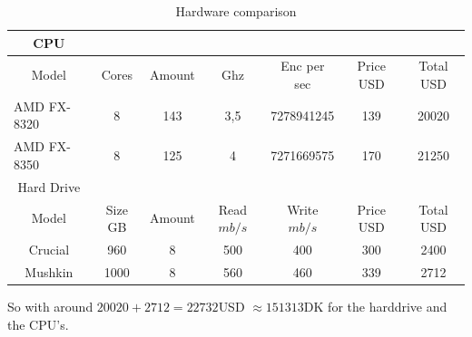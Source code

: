 \begin{table}[h]
\caption{Hardware comparison}
\label{my-label}
\begin{tabular}{|ccccccc}
\hline
\rowcolor[HTML]{EFEFEF}
CPU                                    &                             &                               &                           &                                 &                            & \multicolumn{1}{l|}{\cellcolor[HTML]{EFEFEF}} \\ \hline
\multicolumn{1}{|c|}{Model}            & \multicolumn{1}{c|}{Cores}   & \multicolumn{1}{c|}{Amount} & \multicolumn{1}{c|}{Ghz}  & \multicolumn{1}{c|}{Enc per sec} & \multicolumn{1}{c|}{Price USD} & \multicolumn{1}{c|}{Total USD}                    \\ \hline
\multicolumn{1}{|l|}{AMD FX-8320}      & 8                            & 143                         & 3,5                       & 7278941245                      & 139                    & 20020                                     \\
\multicolumn{1}{|l|}{AMD FX-8350}      & 8                            & 125                         & 4                         & 7271669575                      & 170                   & 21250                                    \\ \hline
\rowcolor[HTML]{EFEFEF}
Hard Drive                                                          &                               &                           &                                 &                           & & \multicolumn{1}{l|}{\cellcolor[HTML]{EFEFEF}} \\ \hline
\multicolumn{1}{|c|}{Model}            & \multicolumn{1}{c|}{Size GB} & \multicolumn{1}{c|}{Amount} & \multicolumn{1}{c|}{Read $mb/s$} & \multicolumn{1}{c|}{Write $mb/s$}      & \multicolumn{1}{c|}{Price USD} & \multicolumn{1}{c|}{Total USD}                    \\ \hline
\multicolumn{1}{|c|}{Crucial}          & 960                          & 8                           & 500                       & 400                             & 300                        & 2400                                          \\
\multicolumn{1}{|c|}{Mushkin} & 1000                         & 8                            & 560                       & 460                             & 339                        & 2712                                          \\ \cline{1-1}
\end{tabular}
\end{table}
So with around $20020+2712=22732 $USD $ \approx 151313 $DK for the harddrive and the CPU's.

